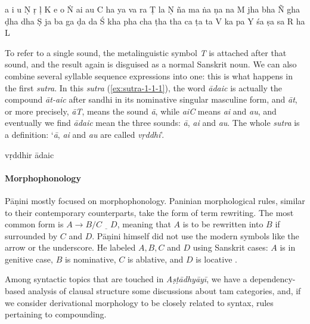\documentclass[a4paper, oneside, 12pt]{report}
\newcommand{\form}[1]{\emph{#1}}
\newcommand*{\source}[1]{\textit{#1}}
\newcommand{\translate}[1]{`#1'}
\begin{document}
\begin{exe}
    \ex\label{ex:sivasutras} a i u Ṇ
    ṛ ḷ K
    e o Ṅ
    ai au C
    ha ya va ra Ṭ
    la Ṇ
    ña ma ṅa ṇa na M
    jha bha Ñ
    gha ḍha dha Ṣ
    ja ba ga ḍa da Ś
    kha pha cha ṭha tha ca ṭa ta V
    ka pa Y
    śa ṣa sa R
    ha L
\end{exe}


To refer to a single sound, the metalinguistic symbol \form{T} is attached after that sound,
and the result again is disguised as a normal Sanskrit noun.
We can also combine several syllable sequence expressions into one:
this is what happens in the first \form{sutra}.
In this \form{sutra} (\ref{ex:sutra-1-1-1}),
the word \form{ādaic} is actually the compound \form{āt-aic} after sandhi 
in its nominative singular masculine form,
and \form{āt}, or more precisely, \form{āT}, means the sound \form{ā}, 
while \form{aiC} means \form{ai} and \form{au},
and eventually we find \form{ādaic} mean the three sounds: \form{ā}, \form{ai} and \form{au}.
The whole \form{sutra} is a definition:
\translate{\form{ā}, \form{ai} and \form{au} are called \form{vṛddhi}}.

\begin{exe}
    \ex\label{ex:sutra-1-1-1} vṛddhir ādaic
\end{exe}

\paragraph*{Morphophonology} Pāṇini mostly focused on morphophonology.
Paninian morphological rules, similar to their contemporary counterparts,
take the form of term rewriting. 
The most common form is $A \to B / C \underline{\quad} D $,
meaning that $A$ is to be rewritten into $B$ if surrounded by $C$ and $D$.
Pāṇini himself did not use the modern symbols like the arrow or the underscore.
He labeled $A, B, C$ and $D$ using Sanskrit cases:
$A$ is in genitive case, $B$ is nominative, $C$ is ablative, and $D$ is locative
\citep{kiparsky1995painian}.

Among syntactic topics that are touched in \source{Aṣṭādhyāyī},
we have a dependency-based analysis of clausal structure
some discussions about \ac{tam} categories,
and, if we consider derivational morphology to be closely related to syntax,
rules pertaining to compounding.
\end{document}

